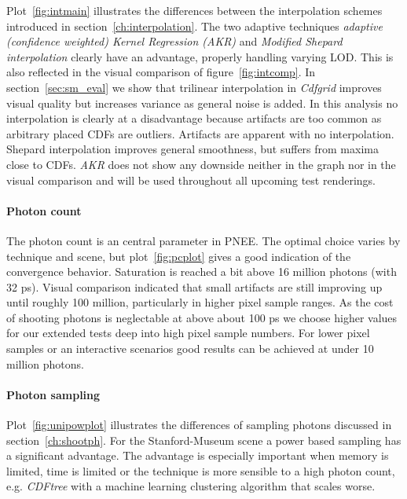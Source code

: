 Plot~\ref{fig:intmain} illustrates the differences between the interpolation schemes introduced in section~\ref{ch:interpolation}. The two adaptive techniques \textit{adaptive (confidence weighted) Kernel Regression (AKR)} and \textit{Modified Shepard interpolation} clearly have an advantage, properly handling varying LOD. This is also reflected in the visual comparison of figure~\ref{fig:intcomp}. In section~\ref{sec:sm_eval} we show that trilinear interpolation in \textit{Cdfgrid} improves visual quality but increases variance as general noise is added. In this analysis no interpolation is clearly at a disadvantage because artifacts are too common as arbitrary placed CDFs are outliers. Artifacts are apparent with no interpolation. Shepard interpolation improves general smoothness, but suffers from maxima close to CDFs. \textit{AKR} does not show any downside neither in the graph nor in the visual comparison and will be used throughout all upcoming test renderings.

\paragraph{Photon count}

The photon count is an central parameter in PNEE. The optimal choice varies by technique and scene, but plot~\ref{fig:pcplot} gives a good indication of the convergence behavior. Saturation is reached a bit above 16 million photons (with 32 ps). Visual comparison indicated that small artifacts are still improving up until roughly 100 million, particularly in higher pixel sample ranges. As the cost of shooting photons is neglectable at above about 100 ps we choose higher values for our extended tests deep into high pixel sample numbers. For lower pixel samples or an interactive scenarios good results can be achieved at under 10 million photons.

\paragraph{Photon sampling}
\label{ch:ev:photonsampling}

Plot~\ref{fig:unipowplot} illustrates the differences of sampling photons discussed in section~\ref{ch:shootph}. For the Stanford-Museum scene a power based sampling has a significant advantage. The advantage is especially important when memory is limited, time is limited or the technique is more sensible to a high photon count, e.g. \textit{CDFtree} with a machine learning clustering algorithm that scales worse.  

